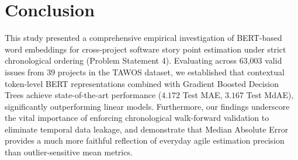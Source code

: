 \documentclass[11pt,a4paper]{article}
\begin{document}
\section{Conclusion}
\label{sec:conclusion}
This study presented a comprehensive empirical investigation of BERT-based word embeddings for cross-project software story point estimation under strict chronological ordering (Problem Statement 4). Evaluating across 63,003 valid issues from 39 projects in the TAWOS dataset, we established that contextual token-level BERT representations combined with Gradient Boosted Decision Trees achieve state-of-the-art performance ($4.172$ Test MAE, $3.167$ Test MdAE), significantly outperforming linear models. Furthermore, our findings underscore the vital importance of enforcing chronological walk-forward validation to eliminate temporal data leakage, and demonstrate that Median Absolute Error provides a much more faithful reflection of everyday agile estimation precision than outlier-sensitive mean metrics.
\end{document}
